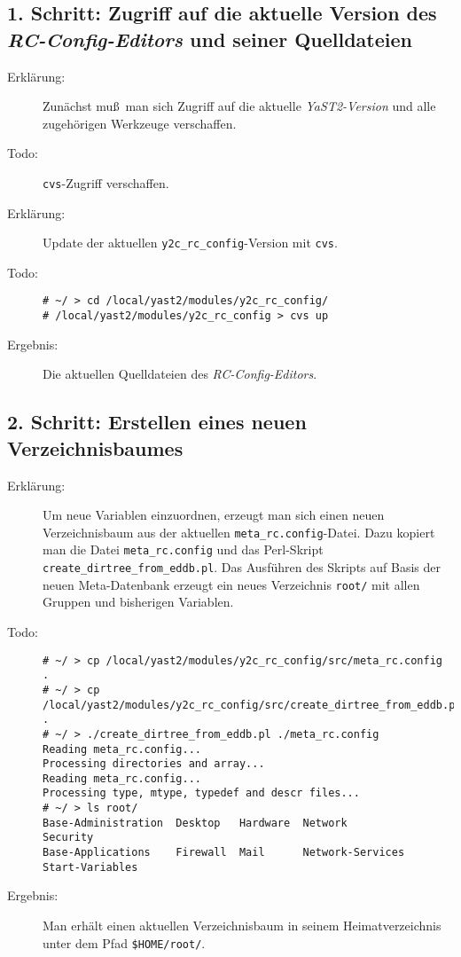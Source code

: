 \documentclass[pdftex,titlepage,10pt]{article}
\begin{document}
\subsection*{1. Schritt: Zugriff auf die aktuelle Version des
  {\em RC-Config-Editors} und seiner Quelldateien}
\begin{description}
\item[Erkl\"arung:] Zun\"achst mu\ss \ man sich Zugriff auf die
  aktuelle {\em YaST2-Version} und alle zugeh\"origen Werkzeuge
  verschaffen.
\item[Todo:] {\tt cvs}-Zugriff verschaffen.
\end{description}
\begin{description}
\item[Erkl\"arung:] Update der aktuellen {\tt y2c\_rc\_config}-Version
  mit {\tt cvs}.
\item[Todo:]
{\footnotesize \begin{verbatim}
# ~/ > cd /local/yast2/modules/y2c_rc_config/
# /local/yast2/modules/y2c_rc_config > cvs up
\end{verbatim}}
\item[Ergebnis:] Die aktuellen Quelldateien des {\em
    RC-Config-Editors}.
\end{description}
\subsection*{2. Schritt: Erstellen eines neuen Verzeichnisbaumes}
\begin{description}
\item[Erkl\"arung:] Um neue Variablen einzuordnen, erzeugt
  man sich einen neuen Verzeichnisbaum aus der aktuellen
  {\tt meta\_rc.config}-Datei. Dazu kopiert man die Datei
  {\tt meta\_rc.config} und das Perl-Skript
  {\tt create\_dirtree\_from\_eddb.pl}. Das Ausf\"uhren des
  Skripts auf Basis der neuen Meta-Datenbank erzeugt ein neues Verzeichnis
  {\tt root/} mit allen Gruppen und bisherigen Variablen.
\item[Todo:]
{\footnotesize \begin{verbatim}
# ~/ > cp /local/yast2/modules/y2c_rc_config/src/meta_rc.config .
# ~/ > cp /local/yast2/modules/y2c_rc_config/src/create_dirtree_from_eddb.pl .
# ~/ > ./create_dirtree_from_eddb.pl ./meta_rc.config
Reading meta_rc.config...
Processing directories and array...
Reading meta_rc.config...
Processing type, mtype, typedef and descr files...
# ~/ > ls root/
Base-Administration  Desktop   Hardware  Network           Security
Base-Applications    Firewall  Mail      Network-Services  Start-Variables
\end{verbatim}}
\item[Ergebnis:] Man erh\"alt einen aktuellen Verzeichnisbaum in seinem
  Heimatverzeichnis unter dem Pfad \verb+$HOME/root/+.
\end{description}
\end{document}
